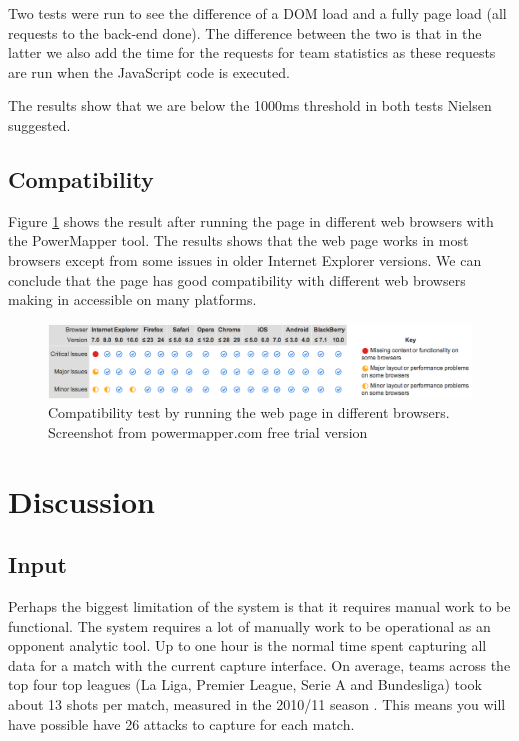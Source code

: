Two tests were run to see the difference of a DOM load and a fully page load (all requests to the back-end done). The difference between the two is that in the latter we also add the time for the requests for team statistics as these requests are run when the JavaScript code is executed. 

The results show that we are below the 1000ms threshold in both tests Nielsen \cite{nielsen} suggested. 

\subsection{Compatibility}

Figure \ref{fig:compa} shows the result after running the page in different web browsers with the PowerMapper tool. The results shows that the web page works in most browsers except from some issues in older Internet Explorer versions. We can conclude that the page has good compatibility with different web browsers making in accessible on many platforms.

\begin{figure}[ht!]
\centering
\includegraphics[width=1\textwidth]{images/evaluation/compa}
\caption{Compatibility test by running the web page in different browsers. Screenshot from powermapper.com free trial version}
\label{fig:compa}
\end{figure}

\section{Discussion}
\subsection{Input}

Perhaps the biggest limitation of the system is that it requires manual work to be functional. The system requires a lot of manually work to be operational as an opponent analytic tool. Up to one hour is the normal time spent capturing all data for a match with the current capture interface. On average, teams across the top four top leagues (La Liga, Premier League, Serie A and Bundesliga) took about 13 shots per match, measured in the 2010/11 season \cite{soccerbynumbers}. This means you will have possible have 26 attacks to capture for each match. 

